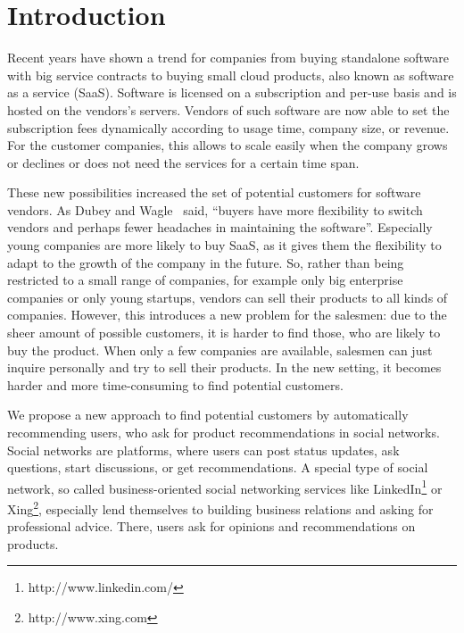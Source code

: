 

\section{Introduction}
\label{sec:introduction}

Recent years have shown a trend for companies from buying standalone software with big service contracts to buying small cloud products, also known as software as a service (SaaS).
Software is licensed on a subscription and per-use basis and is hosted on the vendors's servers.
Vendors of such software are now able to set the subscription fees dynamically according to usage time, company size, or revenue.
For the customer companies, this allows to scale easily when the company grows or declines or does not need the services for a certain time span.

These new possibilities increased the set of potential customers for software vendors.
As Dubey and Wagle~\cite{dubey2007delivering} said, ``buyers have more flexibility to switch vendors and perhaps fewer headaches in maintaining the software''.
Especially young companies are more likely to buy SaaS, as it gives them the flexibility to adapt to the growth of the company in the future.
So, rather than being restricted to a small range of companies, for example only big enterprise companies or only young startups, vendors can sell their products to all kinds of companies.
However, this introduces a new problem for the salesmen: due to the sheer amount of possible customers, it is harder to find those, who are likely to buy the product.
When only a few companies are available, salesmen can just inquire personally and try to sell their products.
In the new setting, it becomes harder and more time-consuming to find potential customers.

We propose a new approach to find potential customers by automatically recommending users, who ask for product recommendations in social networks.
Social networks are platforms, where users can post status updates, ask questions, start discussions, or get recommendations.
A special type of social network, so called business-oriented social networking services like LinkedIn\footnote{http://www.linkedin.com/} or Xing\footnote{http://www.xing.com}, especially lend themselves to building business relations and asking for professional advice.
There, users ask for opinions and recommendations on products.

